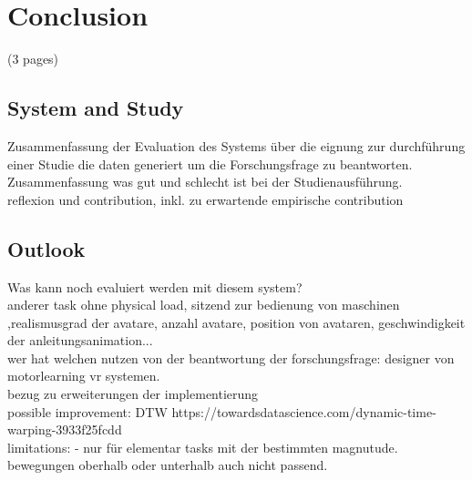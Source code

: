 \chapter{Conclusion}
\label{chapter:conclusion}
(3 pages)
\section{System and Study}
Zusammenfassung der Evaluation des Systems über die eignung zur durchführung einer Studie die daten generiert um die Forschungsfrage zu beantworten.\\
Zusammenfassung was gut und schlecht ist bei der Studienausführung.\\
reflexion und contribution, inkl. zu erwartende empirische contribution\\
\section{Outlook}
\label{section:study_improvements}
Was kann noch evaluiert werden mit diesem system?\\
anderer task ohne physical load, sitzend zur bedienung von maschinen ,realismusgrad der avatare, anzahl avatare, position von avataren, geschwindigkeit der anleitungsanimation...\\
wer hat welchen nutzen von der beantwortung der forschungsfrage: designer von motorlearning vr systemen.\\
bezug zu erweiterungen der implementierung\\
possible improvement: DTW https://towardsdatascience.com/dynamic-time-warping-3933f25fcdd\\

limitations:
- nur für elementar tasks mit der bestimmten magnutude. bewegungen oberhalb oder unterhalb auch nicht passend. 